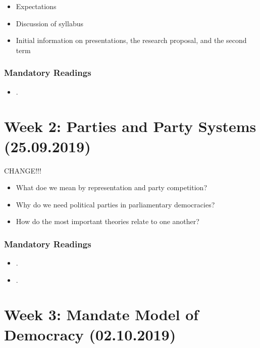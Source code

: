 \documentclass[abstract=on,parskip=full,headings=standardclasses,fontsize=11pt,paper=a4]{scrartcl}
\begin{document}
\begin{itemize}
\renewcommand\labelitemi{--}
\item Expectations
\item Discussion of syllabus
\item Initial information on presentations, the research proposal, and the second term 
\end{itemize}


\subsubsection*{Mandatory Readings}
\begin{itemize}
\item {}.
\end{itemize}


\section{Week 2: Parties and Party Systems (25.09.2019)}

CHANGE!!!
\begin{itemize}
\renewcommand\labelitemi{--}
\item  What doe we mean by representation and party competition? 
\item Why do we need political parties in parliamentary democracies?
\item How do the most important theories relate to one another? 
\end{itemize}

\subsubsection*{Mandatory Readings}
\begin{itemize}
\item {}.
\item {}.
\end{itemize}



\section{Week 3:  Mandate Model of Democracy (02.10.2019)}
\end{document}
